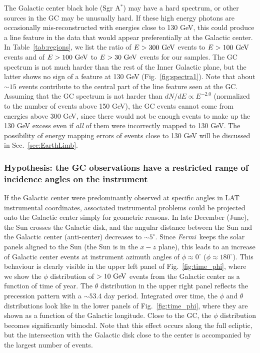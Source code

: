 \documentclass[aps,twocolumn,prd,superscriptaddress,showpacs,nofootinbib,fixfloat]{revtex4}
\newcommand{\Fermi}{{\slshape Fermi}}
\newcommand{\GeV}{{\rm ~GeV}}
\begin{document}
The Galactic center black hole (Sgr A$^*$) may have a hard spectrum, or other
sources in the GC may be unusually hard. If these high energy
photons are occasionally mis-reconstructed with energies
close to 130 GeV, this could produce a line feature in the
data that would appear preferentially at the Galactic center.
In Table~\ref{tab:regions}, we list the ratio of $E>300\GeV$
events to $E>100\GeV$ events and of $E>100\GeV$ to $E>30\GeV$
events for our samples.  The
GC spectrum is not much harder than the rest of the Inner Galactic
plane, but the latter shows no sign of a feature at 130 GeV
(Fig.~\ref{fig:spectra1}). Note that
about $\sim15$ events contribute to the central part of the
line feature seen at the GC. Assuming that the GC spectrum is not
harder than $dN/dE \propto E^{-2.0}$ (normalized to the
number of events above 150 GeV), the GC events cannot come
from energies above 300 GeV, since there would not be enough
events to make up the 130 GeV excess even if \emph{all} of
them were incorrectly mapped to 130 GeV. The possibility of energy
mapping errors of events close to 130 GeV will be discussed
in Sec.~\ref{sec:EarthLimb}.

\subsubsection{Hypothesis: the GC observations have a
restricted range of incidence angles on the instrument}

If the Galactic center were predominantly observed at
specific angles in LAT instrumental coordinates, associated
instrumental problems could be projected onto the Galactic
center simply for geometric reasons. 
In late December (June), the Sun crosses the Galactic disk,
and the angular
distance between the Sun and the Galactic center
(anti-center) decreases to $\sim5^\circ$. Since \Fermi\ keeps
the solar panels aligned to the Sun (the Sun is in the $x-z$ plane), this
leads to an
increase of Galactic center events at instrument azimuth
angles of $\phi\approx 0^\circ$ ($\phi\approx 180^\circ$).
This behaviour is clearly visible in the upper left panel of
Fig.~\ref{fig:time_phi}, where we show the $\phi$
distribution of $>10\GeV$ events from the Galactic center as
a function of time of year.  The $\theta$
distribution in the upper right panel reflects the
precession pattern with a $\sim53.4$ day period. Integrated
over time, the $\phi$ and $\theta$ distributions look like
in the lower panels of Fig.~\ref{fig:time_phi}, where they
are shown as a function of the Galactic longitude. Close to
the GC, the $\phi$ distribution becomes significantly
bimodal. Note that this effect occurs along the full 
ecliptic,
but the intersection with the Galactic disk
close to the center is accompanied by the largest number of
events.
\end{document}
